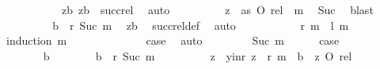 \begin{isabellebody}
\ \ \ \ \ \ \ \ \ \ \ zb{\isacharcolon}{\kern0pt}\ {\isachardoublequoteopen}{\isacharparenleft}{\kern0pt}z{\isacharcomma}{\kern0pt}b{\isacharparenright}{\kern0pt}\ {\isasymin}\ succ{\isacharunderscore}{\kern0pt}rel{\isachardoublequoteclose}\ \isamarkupfalse%
\ auto\isanewline
\ \ \ \ \ \ \isamarkupfalse%
\ \isamarkupfalse%
\ {\isachardoublequoteopen}z\ {\isasymin}\ as\ O\ rel\ {\isacharcircum}{\kern0pt}{\isacharcircum}{\kern0pt}\ m{\isachardoublequoteclose}\ \isamarkupfalse%
\ Suc\ \isamarkupfalse%
\ blast\isanewline
\ \ \ \ \ \ \isamarkupfalse%
\ \isamarkupfalse%
\ {\isachardoublequoteopen}b\ {\isasymin}\ {\isacharquery}{\kern0pt}r\ {\isacharparenleft}{\kern0pt}Suc\ m{\isacharparenright}{\kern0pt}{\isachardoublequoteclose}\ \isamarkupfalse%
\ zb\ \isamarkupfalse%
\ succ{\isacharunderscore}{\kern0pt}rel{\isacharunderscore}{\kern0pt}def\ \isamarkupfalse%
\ auto\isanewline
\ \ \ \ \isamarkupfalse%
\isanewline
\ \ \isamarkupfalse%
\isanewline
{}\isamarkupfalse%
\isanewline
\ \ \isamarkupfalse%
\ {\isachardoublequoteopen}{\isacharquery}{\kern0pt}r\ m\ {\isasymsubseteq}\ {\isacharquery}{\kern0pt}l\ m{\isachardoublequoteclose}\isanewline
\ \ \isamarkupfalse%
\ {\isacharparenleft}{\kern0pt}induction\ m{\isacharparenright}{\kern0pt}\isanewline
\ \ \ \ \isamarkupfalse%
\ {}\isanewline
\ \ \ \ \isamarkupfalse%
\ \isamarkupfalse%
\ {\isacharquery}{\kern0pt}case\ \isamarkupfalse%
\ auto\isanewline
\ \ \isamarkupfalse%
\isanewline
\ \ \ \ \isamarkupfalse%
\ {\isacharparenleft}{\kern0pt}Suc\ m{\isacharparenright}{\kern0pt}\isanewline
\ \ \ \ \isamarkupfalse%
\ {\isacharquery}{\kern0pt}case\isanewline
\ \ \ \ \isamarkupfalse%
\isanewline
\ \ \ \ \ \ \isamarkupfalse%
\ b\isanewline
\ \ \ \ \ \ \isamarkupfalse%
\ {\isachardoublequoteopen}b\ {\isasymin}\ {\isacharquery}{\kern0pt}r\ {\isacharparenleft}{\kern0pt}Suc\ m{\isacharparenright}{\kern0pt}{\isachardoublequoteclose}\isanewline
\ \ \ \ \ \ \isamarkupfalse%
\ \isamarkupfalse%
\ z\ \ y{\isacharunderscore}{\kern0pt}in{\isacharunderscore}{\kern0pt}r{\isacharcolon}{\kern0pt}\ {\isachardoublequoteopen}z\ {\isasymin}\ {\isacharquery}{\kern0pt}r\ m{\isachardoublequoteclose}\ \ {\isachardoublequoteopen}b\ {\isasymin}\ {\isacharbraceleft}{\kern0pt}z{\isacharbraceright}{\kern0pt}\ O\ rel{\isachardoublequoteclose}\ \isamarkupfalse%

\end{isabellebody}
